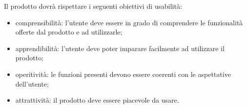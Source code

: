 Il prodotto dovrà rispettare i seguenti obiettivi di usabilità:

\begin{itemize}
    \item comprensibilità: l'utente deve essere in grado di comprendere le funzionalità offerte dal prodotto e ad utilizzarle;
    \item apprendibilità: l'utente deve poter imparare facilmente ad utilizzare il prodotto;
    \item operitività: le funzioni presenti devono essere coerenti con le aspettative dell'utente;
    \item attrattività: il prodotto deve essere piacevole da usare.
\end{itemize}